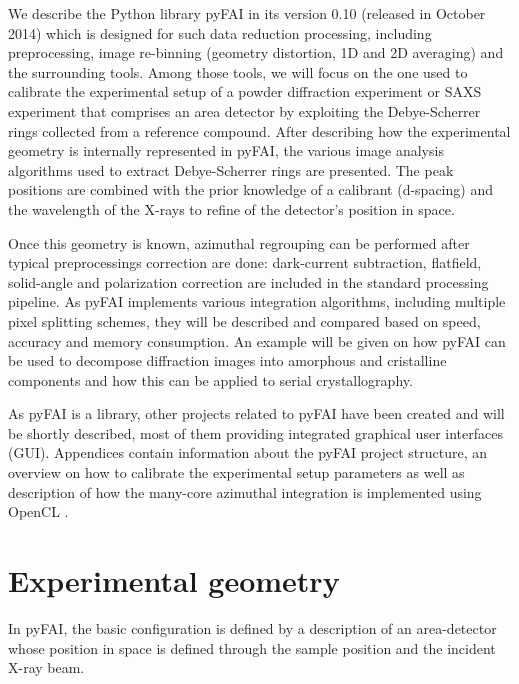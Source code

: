 \documentclass{iucr}
\begin{document}
We describe the Python library pyFAI in its version 0.10
(released in October 2014) which is designed for such data reduction processing,
including preprocessing, image re-binning (geometry distortion, 1D and 2D
averaging) and the surrounding tools. 
Among those tools, we will focus on the one used to
calibrate the experimental setup of a powder diffraction experiment 
or SAXS experiment that comprises
an area detector by exploiting the Debye-Scherrer rings collected from a
reference compound.
After describing how the experimental geometry is internally represented in
pyFAI, the various image analysis algorithms used to extract Debye-Scherrer
rings are presented.
The peak positions are combined with the prior knowledge of a calibrant
(d-spacing) and the wavelength of the X-rays  to refine of the detector's position in space.

Once this geometry is known, azimuthal regrouping can be performed after
typical preprocessings correction are done: dark-current subtraction, flatfield,
solid-angle and polarization correction are included in the standard processing
pipeline.
As pyFAI implements various integration algorithms, including
multiple pixel splitting schemes, they will be described and compared
based on speed, accuracy and memory consumption.
An example will be given on how pyFAI can be used to decompose
diffraction images into amorphous and cristalline components and how this can be
applied to serial crystallography.

As pyFAI is a library, other projects related to pyFAI have been created and
will be shortly described, most of them providing integrated
graphical user interfaces (GUI).
Appendices contain information about the pyFAI project structure, an
overview on how to calibrate the experimental setup parameters as well as
description of how the many-core azimuthal integration is implemented using
OpenCL \cite{opencl}.

\section{Experimental geometry}

In pyFAI, the basic configuration is defined by a description of an
area-detector whose position in space is defined through the sample position and the incident X-ray
beam.
\end{document}
